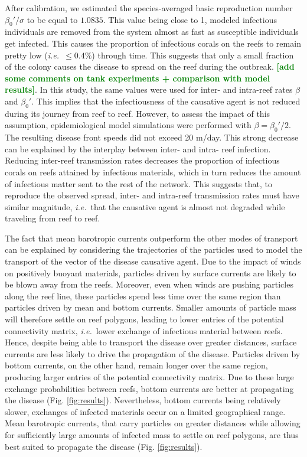 \documentclass[utf8]{frontiersSCNS}
\newcommand{\ie}{{\it i.e.}\ }
\newcommand{\erinn}[1]{\textbf{\textcolor{green}{#1}}}
\newcommand{\dobby}[1]{\textbf{\color{violet}{#1}}}
\begin{document}

After calibration, we estimated the species-averaged basic reproduction number $\beta_0'/\sigma$ to be equal to $1.0835$. This value being close to 1, modeled infectious individuals are removed from the system almost as fast as susceptible individuals get infected. This causes the proportion of infectious corals on the reefs to remain pretty low (\ie $\leq 0.4\%$) through time. This suggests that only a small fraction of the colony causes the disease to spread on the reef during the outbreak. \erinn{[add some comments on tank experiments + comparison with model results]}. In this study, the same values were used for inter- and intra-reef rates $\beta$ and $\beta_0'$. This implies that the infectiousness of the causative agent is not reduced during its journey from reef to reef. However, to assess the impact of this assumption, epidemiological model simulations were performed with $\beta=\beta_0'/2$. The resulting disease front speeds did not exceed 20 m/day. This strong decrease can be explained by the interplay between inter- and intra- reef infection. Reducing inter-reef transmission rates decreases the proportion of infectious corals on reefs attained by infectious materials, which in turn reduces the amount of infectious matter sent to the rest of the network. This suggests that, to reproduce the observed spread, inter- and intra-reef transmission rates must have similar magnitude, \ie that the causative agent is almost not degraded while traveling from reef to reef. \dobby{Is this consistent with Rhodobacterales and Rhizobiales ?}


The fact that mean barotropic currents outperform the other modes of transport can be explained by considering the trajectories of the particles used to model the transport of the vector of the disease causative agent. Due to the impact of winds on positively buoyant materials, particles driven by surface currents are likely to be blown away from the reefs. Moreover, even when winds are pushing particles along the reef line, these particles spend less time over the same region than particles driven by mean and bottom currents. Smaller amounts of particle mass will therefore settle on reef polygons, leading to lower entries of the potential connectivity matrix, \ie lower exchange of infectious material between reefs. Hence, despite being able to transport the disease over greater distances, surface currents are less likely to drive the propagation of the disease. Particles driven by bottom currents, on the other hand, remain longer over the same region, producing larger entries of the potential connectivity matrix. Due to these large exchange probabilities between reefs, bottom currents are better at propagating the disease (Fig. \ref{fig:results}). Nevertheless, bottom currents being relatively slower, exchanges of infected materials occur on a limited geographical range. Mean barotropic currents, that carry particles on greater distances while allowing for sufficiently large amounts of infected mass to settle on reef polygons, are thus best suited to propagate the disease (Fig. \ref{fig:results}).
\end{document}
